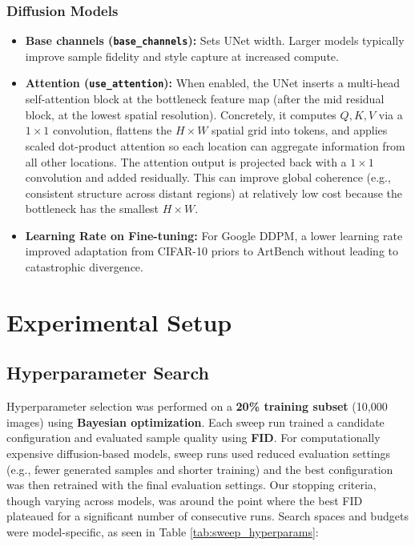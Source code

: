 \documentclass[runningheads]{llncs}
\begin{document}
\subsubsection{Diffusion Models}
\begin{itemize}
    \item \textbf{Base channels (\texttt{base\_channels}):} Sets UNet width. Larger models typically improve sample fidelity and style capture at increased compute.
    \item \textbf{Attention (\texttt{use\_attention}):} When enabled, the UNet inserts a multi-head self-attention block at the bottleneck feature map (after the mid residual block, at the lowest spatial resolution). Concretely, it computes $Q,K,V$ via a $1\times 1$ convolution, flattens the $H\times W$ spatial grid into tokens, and applies scaled dot-product attention so each location can aggregate information from all other locations. The attention output is projected back with a $1\times 1$ convolution and added residually. This can improve global coherence (e.g., consistent structure across distant regions) at relatively low cost because the bottleneck has the smallest $H\times W$.
    \item \textbf{Learning Rate on Fine-tuning:} For Google DDPM, a lower learning rate improved adaptation from CIFAR-10 priors to ArtBench without leading to catastrophic divergence.
\end{itemize}

\section{Experimental Setup}

\subsection{Hyperparameter Search}
Hyperparameter selection was performed on a \textbf{20\% training subset} (10,000 images) using \textbf{Bayesian optimization}. Each sweep run trained a candidate configuration and evaluated sample quality using \textbf{FID}. For computationally expensive diffusion-based models, sweep runs used reduced evaluation settings (e.g., fewer generated samples and shorter training) and the best configuration was then retrained with the final evaluation settings. Our stopping criteria, though varying across models, was around the point where the best FID plateaued for a significant number of consecutive runs. Search spaces and budgets were model-specific, as seen in Table \ref{tab:sweep_hyperparams}:
\end{document}
